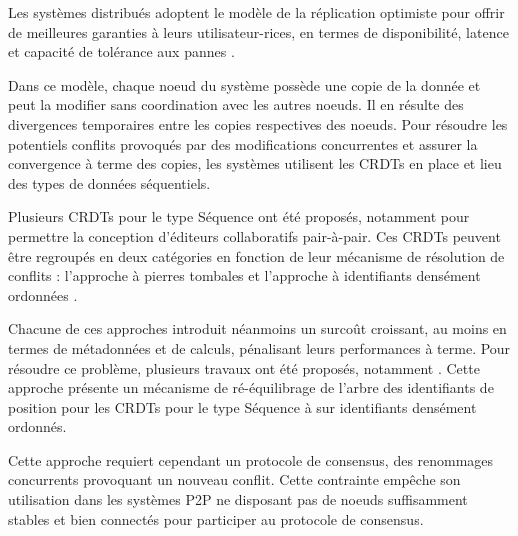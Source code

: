 Les systèmes distribués adoptent le modèle de la réplication optimiste \cite{2005-optimistic-replication-saito} pour offrir de meilleures garanties à leurs utilisateur-rices, en termes de disponibilité, latence et capacité de tolérance aux pannes \cite{pacelc2012}.

Dans ce modèle, chaque noeud du système possède une copie de la donnée et peut la modifier sans coordination avec les autres noeuds.
Il en résulte des divergences temporaires entre les copies respectives des noeuds.
Pour résoudre les potentiels conflits provoqués par des modifications concurrentes et assurer la convergence à terme des copies, les systèmes utilisent les \acp{CRDT} \cite{shapiro_2011_crdt} en place et lieu des types de données séquentiels.

Plusieurs \acp{CRDT} pour le type Séquence ont été proposés, notamment pour permettre la conception d'éditeurs collaboratifs pair-à-pair.
Ces \acp{CRDT} peuvent être regroupés en deux catégories en fonction de leur mécanisme de résolution de conflits : l'approche à pierres tombales \cite{2006-woot-oster,2007-wooto-weiss,2011-evaluation-crdts-ahmed-nacer,ROH2011354,briot:hal-01343941,2019-interleaving-anomalies-collaborative-editors-kleppmann} et l'approche à identifiants densément ordonnées \cite{2009-treedoc-preguica,2009-logoot-weiss,2010-logoot-undo-weiss,2013-logootsplit,2021-these-vic}.

Chacune de ces approches introduit néanmoins un surcoût croissant, au moins en termes de métadonnées et de calculs, pénalisant leurs performances à terme.
Pour résoudre ce problème, plusieurs travaux ont été proposés, notamment \cite{letia:hal-01248270, zawirski:hal-01248197}.
Cette approche présente un mécanisme de ré-équilibrage de l'arbre des identifiants de position pour les \acp{CRDT} pour le type Séquence à sur identifiants densément ordonnés.

Cette approche requiert cependant un protocole de consensus, des renommages concurrents provoquant un nouveau conflit.
Cette contrainte empêche son utilisation dans les systèmes \ac{P2P} ne disposant pas de noeuds suffisamment stables et bien connectés pour participer au protocole de consensus.
